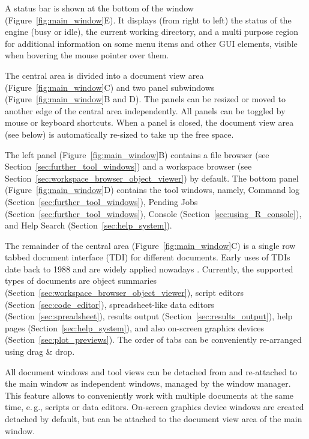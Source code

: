 A status bar is shown at the bottom of the window (Figure~\ref{fig:main_window}E). It displays (from
right to left) the status of the  engine (busy or idle), the
current working directory, and a multi purpose region for additional
information on some menu items and other GUI elements, visible when
hovering the mouse pointer over them.

The central area is divided into a document view area
(Figure~\ref{fig:main_window}C) and two panel subwindows
(Figure~\ref{fig:main_window}B and D). The panels can be resized or moved to
another edge of the central area independently. All panels can be
toggled by mouse or keyboard shortcuts. When a panel is closed, the
document view area (see below) is automatically re-sized to take up the
free space.

The left panel (Figure~\ref{fig:main_window}B) contains a file browser (see Section~\ref{sec:further_tool_windows}) and a
workspace browser (see Section~\ref{sec:workspace_browser_object_viewer}) by default. The
bottom panel (Figure~\ref{fig:main_window}D) contains the tool windows, namely, Command
log (Section~\ref{sec:further_tool_windows}), Pending Jobs (Section~\ref{sec:further_tool_windows}),  Console
(Section~\ref{sec:using_R_console}), and Help Search (Section~\ref{sec:help_system}).

The remainder of the central area (Figure~\ref{fig:main_window}C) is a single row tabbed document
interface (TDI) for different documents. Early uses of TDIs date back to 1988 and are
widely applied nowadays \citep{Hopkins2005, MDN2010,
KimLutteroth2010}. Currently, the supported types of
documents are object summaries (Section~\ref{sec:workspace_browser_object_viewer}), 
script editors (Section~\ref{sec:code_editor}), spreadsheet-like data editors 
(Section~\ref{sec:spreadsheet}), results output (Section~\ref{sec:results_output}), 
help pages (Section~\ref{sec:help_system}), and also
 on-screen graphics devices (Section~\ref{sec:plot_previews}). 
The order of tabs can be conveniently re-arranged
using drag \& drop.

All document windows and tool views can be detached from and re-attached to the main
window as independent windows, managed by the window manager. This feature allows to 
conveniently work with multiple documents
at the same time, e.\,g., scripts or data editors. On{}-screen
graphics device windows are created detached by default, but can 
be attached to the document view area of the main window.

